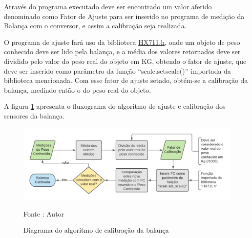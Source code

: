 \par Através do programa executado deve ser encontrado um valor aferido  denominado como Fator de Ajuste para  ser inserido no programa de medição da Balança com o conversor, e assim a calibração seja realizada.

\par O programa de ajuste fará uso da biblioteca \href{https://github.com/bogde/HX711}{HX711.h}, onde um objeto de peso conhecido deve ser lido pela balança, e a média dos valores retornados deve ser dividido pelo valor do peso real do objeto em KG, obtendo o fator de ajuste, que deve ser inserido como parâmetro da função “scale.set\textunderscore scale()” importada da biblioteca mencionada. Com esse fator de ajuste setado, obtém-se a calibração da balança, medindo então o do peso real do objeto.

\par A figura \ref{fig:Calibracao_balanca} apresenta o fluxograma do algoritmo de ajuste e calibração dos sensores da balança.

\begin{figure}[H]
  \centering
  \includegraphics[width=\textwidth]{Figuras/Algoritmo de Calibração da Balança.png}
  \caption{Diagrama do algoritmo de calibração da balança } 
  {\footnotesize Fonte : Autor } 
  \label{fig:Calibracao_balanca}
\end{figure}
